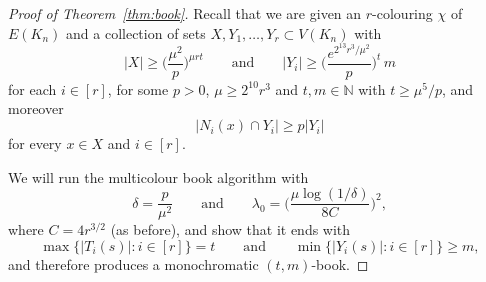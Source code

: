 \documentclass[12pt,reqno]{amsart}
\theoremstyle{definition}
\theoremstyle{remark}
\newcommand\N{\mathbb{N}}
\renewcommand{\ge}{\geqslant}
\def\N{\mathbb{N}}
\begin{document}
%
\begin{proof}[Proof of Theorem~\ref{thm:book}]
	Recall that we are given an \(r\)-colouring \(\chi\) of \(E(K_n)\) and a collection of
	sets \(X,Y_1,\ldots,Y_r \subset V(K_n)\) with
	\begin{equation}
		\label{eq:book:thm:conditions}
		|X| \ge \bigg( \frac{\mu^2}{p} \bigg)^{\mu r t} \qquad \text{and} \qquad |Y_i| \ge \bigg( \frac{e^{2^{13} r^3 / \mu^2}}{p} \bigg)^t \, m
	\end{equation}
	for each \(i \in [r]\), for some \(p > 0\), \(\mu \ge 2^{10} r^3\) and \(t,m \in \N\) with \(t \ge \mu^5 / p\), and moreover
	\begin{equation}
		\label{eq:book:thm:min:degree}
		|N_i(x) \cap Y_i| \ge p|Y_i|
	\end{equation}
	for every \(x \in X\) and \(i \in [r]\).

	We will run the multicolour book algorithm with
	\begin{equation*}
		\delta = \frac{p}{\mu^2} \qquad \text{and} \qquad \lambda_0 = \bigg( \frac{\mu \log(1/\delta)}{8C} \bigg)^2,
	\end{equation*}
	where \(C = 4r^{3/2}\) (as before), and show that it ends with
	\begin{equation*}
		\max \big\{ |T_i(s)| : i \in [r] \big\} = t \qquad \text{and} \qquad \min\big\{ |Y_i(s)| : i \in [r] \big\} \ge m,
	\end{equation*}
	and therefore produces a monochromatic \((t,m)\)-book.


\end{proof}
\end{document}
